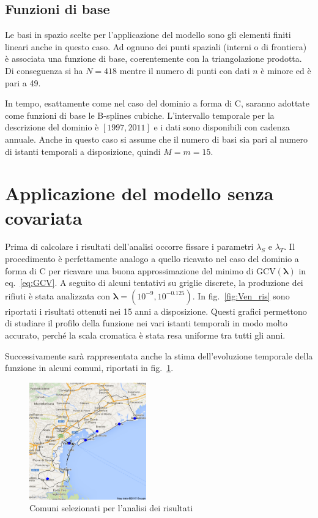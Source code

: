 \documentclass[a4paper,11pt,twoside,openright]{book}							%
\begin{document}
\subsection{Funzioni di base}
Le basi in spazio scelte per l'applicazione del modello sono gli elementi finiti lineari anche in questo caso. Ad ognuno dei punti spaziali (interni o di frontiera) è associata una funzione di base, coerentemente con la triangolazione prodotta. Di conseguenza si ha $N=418$ mentre il numero di punti con dati $n$ è minore ed è pari a 49.

In tempo, esattamente come nel caso del dominio a forma di C, saranno adottate come funzioni di base le B-splines cubiche. L'intervallo temporale per la descrizione del dominio è $[1997,2011]$ e i dati sono disponibili con cadenza annuale. Anche in questo caso si assume che il numero di basi sia pari al numero di istanti temporali a disposizione, quindi $M=m=15$.

\section{Applicazione del modello senza covariata}

Prima di calcolare i risultati dell'analisi occorre fissare i parametri $\lambda_S$ e $\lambda_T$. Il procedimento è perfettamente analogo a quello ricavato nel caso del dominio a forma di C per ricavare una buona approssimazione del minimo di $\mathrm{GCV}(\bm \lambda)$ in eq.~\ref{eq:GCV}. A seguito di alcuni tentativi su griglie discrete, la produzione dei rifiuti è stata analizzata con $\bm \lambda = (10^{-9}, 10^{-0.125})$. In fig.~\ref{fig:Ven_ris} sono riportati i risultati ottenuti nei 15 anni a disposizione. Questi grafici permettono di studiare il profilo della funzione nei vari istanti temporali in modo molto accurato, perché la scala cromatica è stata resa uniforme tra tutti gli anni.

Successivamente sarà rappresentata anche la stima dell'evoluzione temporale della funzione in alcuni comuni, riportati in fig.~\ref{fig:Ven_selected}.
\newline
\newline
\newline
\newline
\newline
\begin{figure}[h]
	\centering
	\includegraphics[width=0.45\textwidth]{Immagini/comuni_selezionati.png}   
   \caption{Comuni selezionati per l'analisi dei risultati}
	\label{fig:Ven_selected}
\end{figure}
\end{document}
